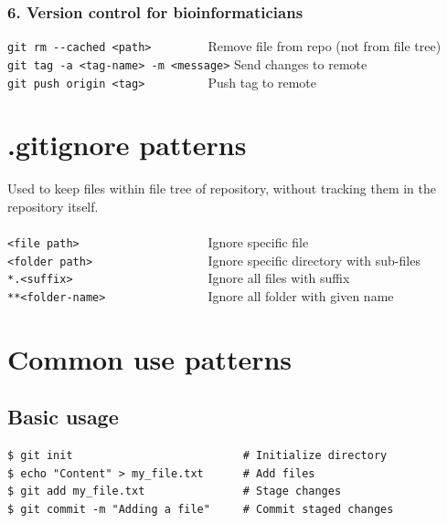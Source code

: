 \documentclass[12pt]{report}
\begin{document}
\subsubsection{6. Version control for bioinformaticians}

\verb$git rm --cached <path>        $ \hspace*{25pt} Remove file from repo (not from file tree) \\
\verb$git tag -a <tag-name> -m <message>$ \hspace*{0pt} Send changes to remote \\
\verb$git push origin <tag>         $ \hspace*{25pt} Push tag to remote

\newpage

\section*{.gitignore patterns}

Used to keep files within file tree of repository, without tracking them in the repository itself. \\\\
\verb$<file path>                   $ \hspace*{25pt} Ignore specific file \\
\verb$<folder path>                 $ \hspace*{25pt} Ignore specific directory with sub-files \\
\verb$*.<suffix>                    $ \hspace*{25pt} Ignore all files with suffix \\
\verb$**<folder-name>               $ \hspace*{25pt} Ignore all folder with given name \\

\section*{Common use patterns}

\subsection*{Basic usage}

\begin{codebox}
\begin{verbatim}
$ git init                          # Initialize directory
$ echo "Content" > my_file.txt      # Add files
$ git add my_file.txt               # Stage changes
$ git commit -m "Adding a file"     # Commit staged changes
\end{verbatim}
\end{codebox}
\end{document}
